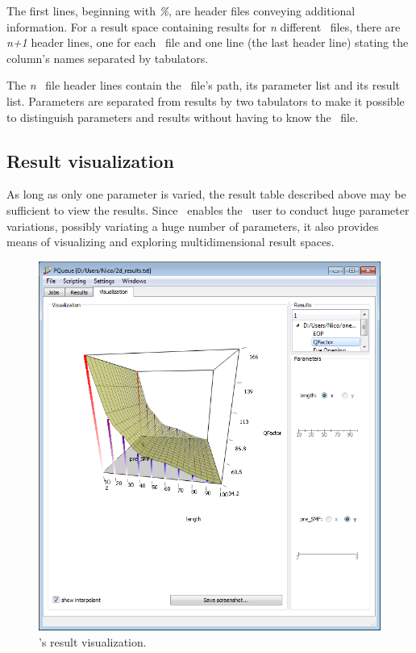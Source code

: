The first lines, beginning with \textit{\%}, are header files conveying additional information.
For a result space containing results for \textit{n} different \PJOB\ files,
there are \textit{n+1} header lines,
one for each \PJOB\ file and one line (the last header line) stating the column's names separated by tabulators.

The \textit{n} \PJOB\ file header lines contain the \PJOB\ file's path,
its parameter list and its result list.
Parameters are separated from results by two tabulators
to make it possible to distinguish parameters and results without having to know the \PJOB\ file. 



\subsection{Result visualization}
\label{pqueue:visualization}

As long as only one parameter is varied,
the result table described above may be sufficient to view the results.
Since \PQUEUE\ enables the \PHO\ user to conduct huge parameter variations,
possibly variating a huge number of parameters,
it also provides means of visualizing and exploring multidimensional result spaces.

\begin{figure}[!ht]
\includegraphics[width=\textwidth]{Screenshots/PQueue/visualization.png}
\caption{\PQUEUE's result visualization.}
\label{pqueue:visualization_screenshot}
\end{figure}

